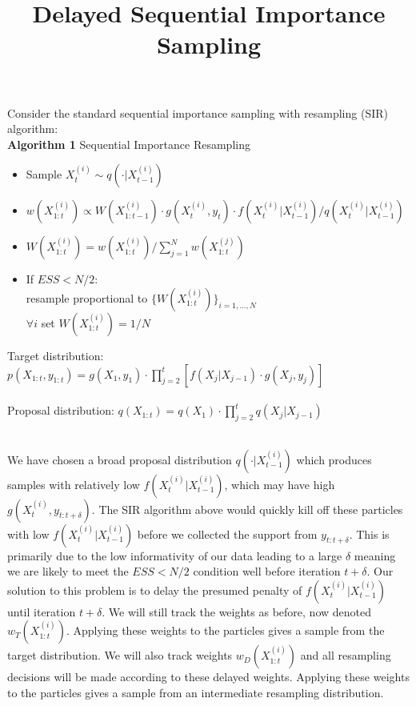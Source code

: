 \documentclass{article}
\title{Delayed Sequential Importance Sampling}
\begin{document}
\maketitle

\noindent Consider the standard sequential importance sampling with resampling (SIR) algorithm:\\

\textbf{Algorithm 1} Sequential Importance Resampling
\begin{itemize}
\item Sample $X_t^{(i)} \sim q( \cdot | X_{t-1}^{(i)})$
\item $w(X_{1:t}^{(i)}) \propto W(X_{1:t-1}^{(i)}) \cdot g(X_t^{(i)}, y_t) \cdot
  f(X_t^{(i)} | X_{t-1}^{(i)}) / q(X_t^{(i)} | X_{t-1}^{(i)})$
\item $W(X_{1:t}^{(i)}) = w(X_{1:t}^{(i)}) / \sum_{j=1}^N w(X_{1:t}^{(j)})$
\item If $ESS < N/2$:\\
resample proportional to $\{W(X_{1:t}^{(i)})\}_{i=1,...,N}$\\
$\forall i$ set $W(X_{1:t}^{(i)}) = 1/N$
\end{itemize}

\vspace{1cm}

\noindent Target distribution: $p(X_{1:t},y_{1:t}) = g(X_1, y_1) \cdot \prod_{j=2}^t [f(X_j|X_{j-1}) \cdot g(X_j, y_j)]$\\\\
\noindent Proposal distribution: $q(X_{1:t})= q(X_1) \cdot \prod_{j=2}^t q(X_j|X_{j-1})$\\\\
\vspace{1cm}

\noindent We have chosen a broad proposal distribution $q( \cdot | X_{t-1}^{(i)} )$ which produces samples with 
relatively low $ f(X_t^{(i)} | X_{t-1}^{(i)}) $, which may have high $ g(X_t^{(i)}, y_{t:t+\delta}) $.
The SIR algorithm above would quickly kill off these particles with low $ f(X_t^{(i)} | X_{t-1}^{(i)}) $
before we collected the support from $y_{t:t+\delta}$. This is primarily due to the low informativity of
our data leading to a large $\delta$ meaning we are likely to meet the
$ESS < N/2$ condition well before iteration $t+\delta$. Our solution to this problem
is to delay the presumed penalty of $ f(X_t^{(i)} | X_{t-1}^{(i)}) $ until iteration
$t+\delta$. We will still track the weights as before, now denoted $w_T(X_{1:t}^{(i)})$.
Applying these weights to the particles gives a sample from the target distribution. 
We will also track weights $w_D(X_{1:t}^{(i)})$ and all resampling decisions will be made
according to these delayed weights. Applying these weights to the particles
gives a sample from an intermediate resampling distribution.\\
\end{document}
